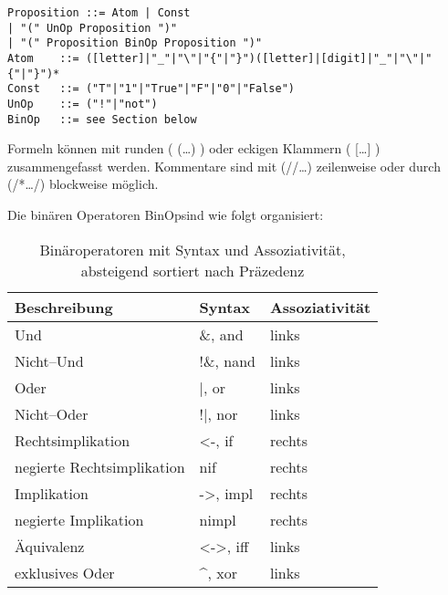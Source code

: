 \documentclass[ngerman,a4paper,abstracton,open=right,twoside=false,toc=listofnumbered,bibtotocnumbered]{scrreprt}
\begin{document}
\begin{verbatim}	
Proposition	::=	Atom | Const
| "(" UnOp Proposition ")"
| "(" Proposition BinOp Proposition ")"
Atom	::=	([letter]|"_"|"\"|"{"|"}")([letter]|[digit]|"_"|"\"|"{"|"}")*
Const	::=	("T"|"1"|"True"|"F"|"0"|"False")
UnOp	::=	("!"|"not")
BinOp	::=	see Section below
\end{verbatim}

Formeln können mit runden ( (\dots) ) oder eckigen Klammern ( [\dots] ) zusammengefasst werden. Kommentare sind mit (//\dots) zeilenweise oder durch (/*\dots */) blockweise möglich.

Die binären Operatoren \glqq BinOp\grqq sind wie folgt organisiert:

\begin{table}[h!]
	\begin{tabular}{|l|l|l|}
		\hline
		\textbf{Beschreibung} & \textbf{Syntax} & \textbf{Assoziativität} \\
		\hline
		Und & \&, and & links \\ \hline
		Nicht--Und & !\&, nand & links \\ \hline
		Oder & |, or & links \\ \hline
		Nicht--Oder & !|, nor & links \\ \hline
		Rechtsimplikation & <-, if & rechts \\ \hline
		negierte Rechtsimplikation & nif & rechts \\ \hline
		Implikation & ->, impl & rechts \\ \hline
		negierte Implikation & nimpl & rechts \\ \hline
		Äquivalenz & <->, iff & links \\ \hline
		exklusives Oder & \textasciicircum, xor & links \\ \hline
	\end{tabular}
	\caption{Binäroperatoren mit Syntax und Assoziativität, absteigend sortiert nach Präzedenz}
\end{table}
\end{document}
